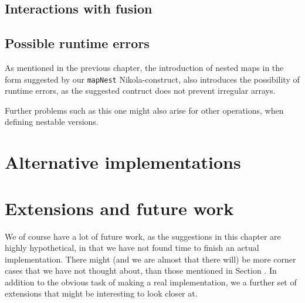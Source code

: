 

\subsection{Interactions with fusion}

\subsection{Possible runtime errors}

As mentioned in the previous chapter, the introduction of nested maps
in the form suggested by our \lstinline{mapNest} Nikola-construct,
also introduces the possibility of runtime errors, as the suggested
contruct does not prevent irregular arrays.

Further problems such as this one might also arise for other
operations, when defining nestable versions.


\section{Alternative implementations}

\section{Extensions and future work}
We of course have a lot of future work, as the suggestions in this
chapter are highly hypothetical, in that we have not found time to
finish an actual implementation. There might (and we are almost that
there will) be more corner cases that we have not thought about, than
those mentioned in Section . In addition to the obvious task
of making a real implementation, we a further set of extensions that
might be interesting to look closer at.

